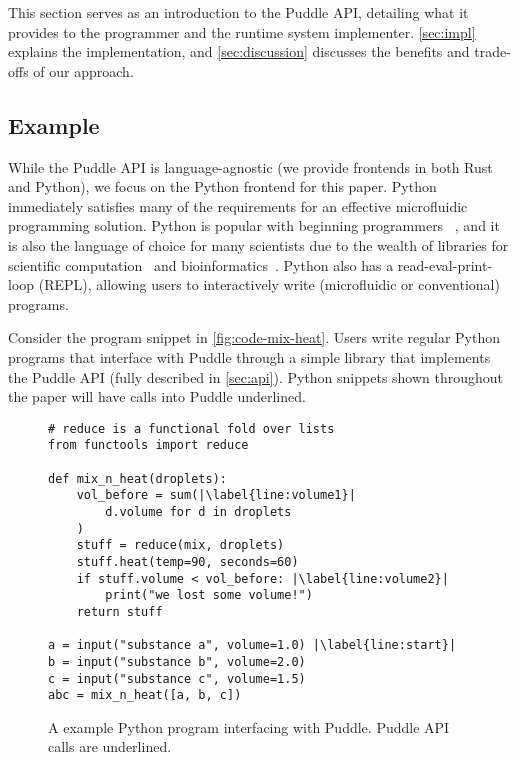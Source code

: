 \documentclass[sigplan, screen]{acmart}
\newcommand\mw[2][]{\todo[color=blue!20, #1]{\sf #2}}
\begin{document}
This section serves as an introduction to the Puddle API, detailing what it provides to the programmer and the runtime system implementer.
\autoref{sec:impl} explains the implementation,
and \autoref{sec:discussion} discusses the benefits and trade-offs of our approach.

\subsection{Example}

While the Puddle API is language-agnostic (we provide frontends in both Rust and Python), we focus on the Python frontend for this paper.
Python immediately satisfies many of the requirements for an effective microfluidic programming solution.
Python is popular with beginning programmers ~\cite{python-intro}, and it is also the language of choice for many scientists due to the wealth of libraries for scientific computation~\cite{scipy} and bioinformatics~\cite{biopython}.
Python also has a read-eval-print-loop (REPL), allowing users to interactively write (microfluidic or conventional) programs.

Consider the program snippet in \autoref{fig:code-mix-heat}.
Users write regular Python programs that interface with Puddle through a simple library that implements the Puddle API (fully described in \autoref{sec:api}).
Python snippets shown throughout the paper will have calls into Puddle underlined.

\begin{figure}
  \centering
\begin{lstlisting}[emphstyle=\underline, deletekeywords={temperature}]
# reduce is a functional fold over lists
from functools import reduce

def mix_n_heat(droplets):
    vol_before = sum(|\label{line:volume1}|
        d.volume for d in droplets
    )
    stuff = reduce(mix, droplets)
    stuff.heat(temp=90, seconds=60)
    if stuff.volume < vol_before: |\label{line:volume2}|
        print("we lost some volume!")
    return stuff

a = input("substance a", volume=1.0) |\label{line:start}|
b = input("substance b", volume=2.0)
c = input("substance c", volume=1.5)
abc = mix_n_heat([a, b, c])
\end{lstlisting}

  \caption{
    A example Python program interfacing with Puddle.
    Puddle API calls are underlined.
  }
  \label{fig:code-mix-heat}
\end{figure}
\end{document}
